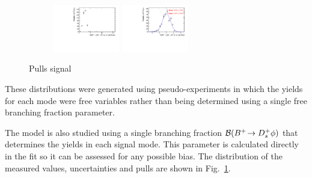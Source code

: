 \begin{figure}[!h]
\begin{subfigure}[t]{1.0\textwidth}
      \includegraphics[width=0.32\textwidth]{figs/B2DsPhi/Plots_DsKK_Error_yield_peak_total_DsPhi_Ds2KPiPi_toy_both_DsBDTbin1_PhiBDTbin1_both_both.pdf}
      \includegraphics[width=0.32\textwidth]{figs/B2DsPhi/Plots_DsKK_Pull_yield_peak_total_DsPhi_Ds2KPiPi_toy_both_DsBDTbin1_PhiBDTbin1_both_both.pdf}
      \caption{\decay{\Dsp}{\Kp\pim\pip}}
   \end{subfigure}

   \caption{Pulls signal}
   \label{fig:B2DsPhi_Pulls_signal}
\end{figure}

These distributions were generated using pseudo-experiments in which the yields for each \Dsp mode were free variables rather than being determined using a single free branching fraction parameter.

The model is also studied using a single branching fraction ${\mathcal{B}}({{{B}^+}}\!\rightarrow {\ensuremath{{D}^+_{s}}}\phi)$ that determines the yields in each signal mode. This parameter is calculated directly in the fit so it can be assessed for any possible bias. The distribution of the measured values, uncertainties and pulls are shown in Fig.~\ref{fig:B2DsPhi_Pulls_signal}.


